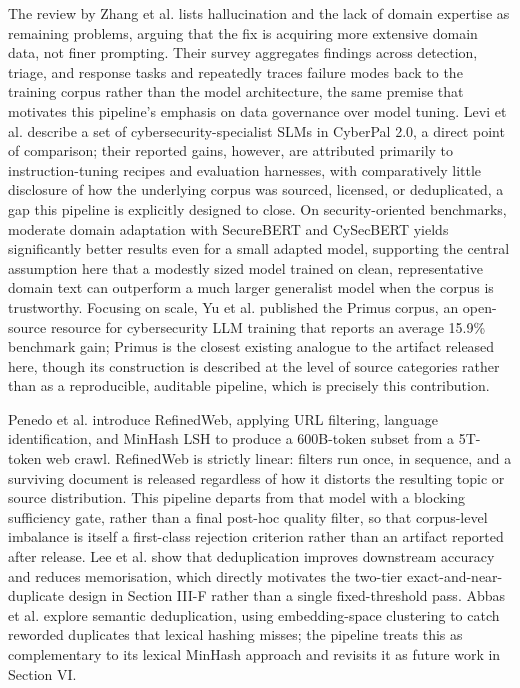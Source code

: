 \documentclass[conference]{IEEEtran}
\begin{document}
The review by Zhang et al. \cite{zhang2025llms} lists hallucination and the lack of domain expertise as remaining problems, arguing that the fix is acquiring more extensive domain data, not finer prompting. Their survey aggregates findings across detection, triage, and response tasks and repeatedly traces failure modes back to the training corpus rather than the model architecture, the same premise that motivates this pipeline's emphasis on data governance over model tuning. Levi et al. \cite{levi2025cyberpal} describe a set of cybersecurity-specialist SLMs in CyberPal 2.0, a direct point of comparison; their reported gains, however, are attributed primarily to instruction-tuning recipes and evaluation harnesses, with comparatively little disclosure of how the underlying corpus was sourced, licensed, or deduplicated, a gap this pipeline is explicitly designed to close. On security-oriented benchmarks, moderate domain adaptation with SecureBERT \cite{aghaei2022securebert} and CySecBERT \cite{bayer2024cysecbert} yields significantly better results even for a small adapted model, supporting the central assumption here that a modestly sized model trained on clean, representative domain text can outperform a much larger generalist model when the corpus is trustworthy. Focusing on scale, Yu et al. \cite{yu2025primus} published the Primus corpus, an open-source resource for cybersecurity LLM training that reports an average 15.9\% benchmark gain; Primus is the closest existing analogue to the artifact released here, though its construction is described at the level of source categories rather than as a reproducible, auditable pipeline, which is precisely this contribution.

Penedo et al. \cite{penedo2023refinedweb} introduce RefinedWeb, applying URL filtering, language identification, and MinHash LSH to produce a 600B-token subset from a 5T-token web crawl. RefinedWeb is strictly linear: filters run once, in sequence, and a surviving document is released regardless of how it distorts the resulting topic or source distribution. This pipeline departs from that model with a blocking sufficiency gate, rather than a final post-hoc quality filter, so that corpus-level imbalance is itself a first-class rejection criterion rather than an artifact reported after release. Lee et al. \cite{lee2022deduplication} show that deduplication improves downstream accuracy and reduces memorisation, which directly motivates the two-tier exact-and-near-duplicate design in Section III-F rather than a single fixed-threshold pass. Abbas et al. \cite{abbas2023semdedup} explore semantic deduplication, using embedding-space clustering to catch reworded duplicates that lexical hashing misses; the pipeline treats this as complementary to its lexical MinHash approach and revisits it as future work in Section VI.
\end{document}
